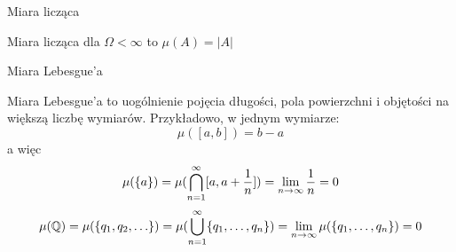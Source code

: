 \begin{example}
	Miara licząca
	
	Miara licząca dla \(\Omega < \infty\) to \(\mu(A) = |A|\)
\end{example}

\begin{example} 
	Miara Lebesgue'a
	
	Miara Lebesgue'a to uogólnienie pojęcia długości, pola powierzchni i objętości na większą liczbę wymiarów. Przykładowo, w jednym wymiarze:
	\[
		\mu([a, b]) = b - a
	\]
	a więc
	\[
		\mu(\set{a}) = \mu(\bigcap_{n=1}^\infty [a, a + \frac{1}{n}]) = \lim_{n \to \infty} \frac{1}{n} = 0
	\]
	\[
		\mu(\rational) = \mu(\set{q_1, q_2, \dots}) = \mu(\bigcup_{n=1}^\infty \set{q_1, \dots, q_n}) = \lim_{n \to \infty} \mu(\set{q_1, \dots, q_n}) = 0
	\]
\end{example}

